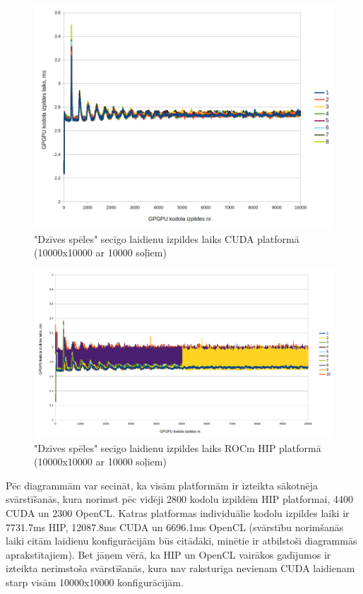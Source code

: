 \begin{figure}[H] \centering
    \includegraphics[width=\textwidth]{images/gol_cuda_consecutive_runs_10k_by_10k_10ksteps.png}
    \caption{"Dzīves spēles" secīgo laidienu izpildes laiks CUDA 
    platformā (10000x10000 ar 10000 soļiem)}
    \label{img:consecutive_kernel_exec_gol_cuda}
\end{figure}


\begin{figure}[H] \centering
    \includegraphics[width=\textwidth]{images/gol_hip_consecutive_runs_10k_by_10k_10ksteps.png}
    \caption{"Dzīves spēles" secīgo laidienu izpildes laiks ROCm HIP
    platformā (10000x10000 ar 10000 soļiem)}
    \label{img:consecutive_kernel_exec_gol_hip}
\end{figure}

Pēc diagrammām var secināt, ka visām platformām ir izteikta sākotnēja
svārstīšanās, kura norimst pēc vidēji 2800 kodolu izpildēm HIP platformai, 4400
CUDA un 2300 OpenCL. Katras platformas individuālie kodolu izpildes laiki ir
7731.7\si{\ms} HIP, 12087.8\si{\ms} CUDA un 6696.1\si{\ms} OpenCL (svārstību
norimšanās laiki citām laidienu konfigurācijām būs citādāki, minētie
ir atbilstoši diagrammās aprakstītajiem). Bet jāņem vērā, ka HIP un OpenCL
vairākos gadījumos ir izteikta nerimstoša svārstīšanās, kura nav raksturīga
nevienam CUDA laidienam starp visām 10000x10000 konfigurācijām. 

